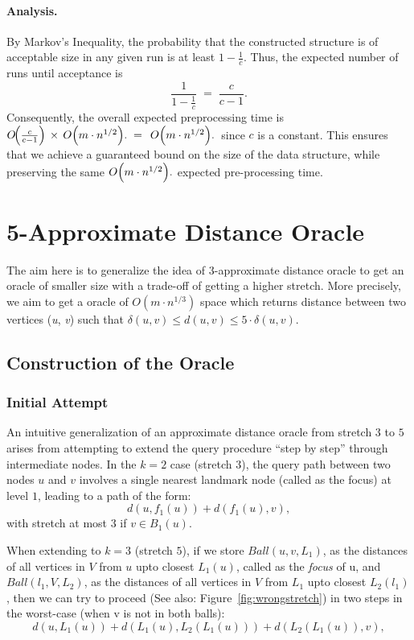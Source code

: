 \documentclass{article}
\begin{document}
\paragraph{Analysis.}
By Markov’s Inequality, the probability that the constructed structure is of acceptable size in any given run is at least \(1 - \frac{1}{c}\). Thus, the expected number of runs until acceptance is
\[
\frac{1}{1 - \frac{1}{c}} \;=\; \frac{c}{c-1}.
\]
Consequently, the overall expected preprocessing time is
\(
O\!\Bigl(\tfrac{c}{c-1}\Bigr) \,\times\, 
O\Bigl(m \cdot n^{1/2}\Bigr). \;=\; \, 
O\Bigl(m \cdot n^{1/2}\Bigr). \,
\)
since \(c\) is a constant. This ensures that we achieve a guaranteed bound on the size of the data structure, while preserving the same \(
O\Bigl(m \cdot n^{1/2}\Bigr).
\) expected pre-processing time.

\section{5-Approximate Distance Oracle}
The aim here is to generalize the idea of 3-approximate distance oracle to get an oracle of smaller size with a trade-off of getting a higher stretch. More precisely, we aim to get a oracle of \(O(m \cdot n^{1/3})\) space which returns distance between two vertices (\textit{u}, \textit{v}) such that \(\delta(u, v) \leq d(u, v) \leq 5 \cdot \delta(u, v)\). 

\subsection{Construction of the Oracle}

\subsubsection{Initial Attempt}

An intuitive generalization of an approximate distance oracle from stretch $3$ to $5$ arises from attempting to extend the query procedure ``step by step'' through intermediate nodes. In the $k=2$ case (stretch $3$), the query path between two nodes $u$ and $v$ involves a single nearest landmark node (called as the focus) at level $1$, leading to a path of the form:
\[
d(u, f_1(u)) + d(f_1(u), v),
\]
with stretch at most $3$ if $v \in B_1(u)$.

When extending to $k=3$ (stretch $5$), if we store \(Ball(u, v, L_1)\), as the distances of all vertices in \(V\) from \(u\) upto closest \(L_1(u)\), called as the \emph{focus} of u, and \(Ball(l_1, V, L_2)\), as the distances of all vertices in \(V\) from \(L_1\) upto closest \(L_2(l_1)\), then we can try to proceed (See also: Figure~\ref{fig:wrongstretch}) in two steps in the worst-case (when v is not in both balls):
\[
d(u, L_1(u)) + d(L_1(u), L_2(L_1(u))) + d(L_2(L_1(u)), v),
\]
\end{document}
